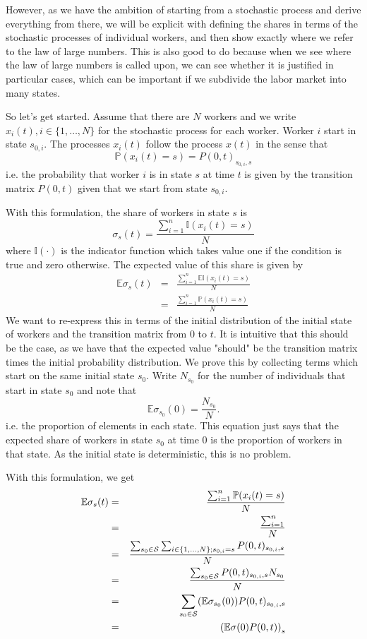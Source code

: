 However, as we have the ambition of starting from a stochastic process and derive everything from there, we will be explicit with defining the shares in terms of the stochastic processes of individual workers, and then show exactly where we refer to the law of large numbers. This is also good to do because when we see where the law of large numbers is called upon, we can see whether it is justified in particular cases, which can be important if we subdivide the labor market into many states.

So let's get started.  Assume that there are $N$ workers and we write $x_{i}(t), i \in \{1,\dots, N\}$ for the stochastic process for each worker. Worker $i$ start in state $s_{0,i}$. The processes $x_{i}(t)$ follow the process $x(t)$ in the sense that
\[
\mathbb{P}(x_i(t) = s) = P(0,t)_{s_{0,i},s}
\]
i.e. the probability that worker $i$ is in state $s$ at time $t$ is given by the transition matrix $P(0,t)$ given that we start from state $s_{0,i}$.

With this formulation, the share of workers in state $s$ is
\[
\sigma_s(t)=\frac{\sum_{i=1}^n \mathbb{I}(x_{i}(t) = s)}{N}
\]
where $\mathbb{I}(\cdot)$ is the indicator function which takes value one if the condition is true and zero otherwise. The expected value of this share is given by
\begin{eqnarray*}
\mathbb{E}\sigma_s(t)&=&\frac{\sum_{i=1}^n \mathbb{E}\mathbb{I}(x_{i}(t) = s)}{N}\\
&=& \frac{\sum_{i=1}^n \mathbb{P}(x_{i}(t) = s)}{N}
\end{eqnarray*}
We want to re-express this in terms of the initial distribution of the initial state of workers and the transition matrix from $0$ to $t$. It is intuitive that this should be the case, as we have that the expected value "should" be the transition matrix times the initial probability distribution. We prove this by collecting terms which start on the same initial state $s_0$. Write $N_{s_0}$ for the number of individuals that start in state $s_0$ and note that
\[
\mathbb{E}\sigma_{s_0}(0) = \frac{N_{s_0}}{N}.
\]
i.e. the proportion of elements in each state. This equation just says that the expected share of workers in state $s_0$ at time $0$ is the proportion of workers in that state. As the initial state is deterministic, this is no problem.

With this formulation, we get 
\begin{eqnarray*}
	\mathbb{E}\sigma_s(t) &=& \frac{\sum_{i=1}^n \mathbb{P}(x_{i}(t) = s)}{N}\\
	&=&  \frac{\sum_{i=1}^n }{N}\\
	&=& \frac{\sum_{s_0 \in \cal S} \sum_{i\in \{1,\dots, N\}; s_{0,i}=s} P(0,t)_{s_{0,i},s}}{N}\\
	&=& \frac{\sum_{s_0 \in \cal S} P(0,t)_{s_{0,i},s} N_{s_0}}{N}\\
	&=& \sum_{s_0 \in \cal S} (\mathbb{E}\sigma_{s_0}(0)) P(0,t)_{s_{0,i},s}\\
	&=& \left(\mathbb{E}\sigma(0)P(0,t)\right)_s
\end{eqnarray*}

